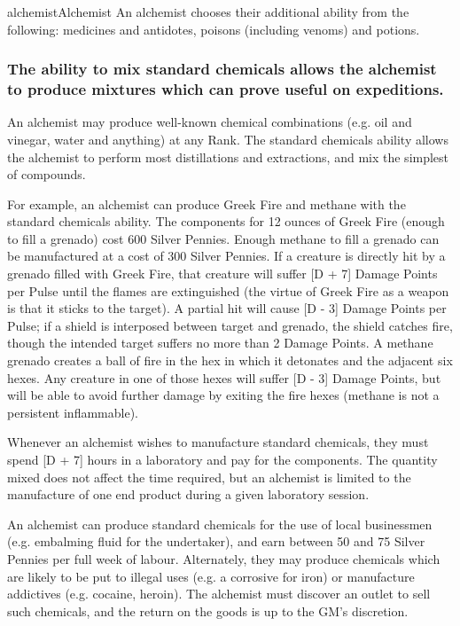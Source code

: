 \begin{Skill}[1.1]{alchemist}{Alchemist}
An alchemist chooses their additional ability from the following:
medicines and antidotes, poisons (including venoms) and potions.

\subsubsection{The ability to mix standard chemicals allows the alchemist to produce
mixtures which can prove useful on expeditions.}

An alchemist may produce well-known chemical combinations (e.g. oil
and vinegar, water and anything) at any Rank. The standard chemicals
ability allows the alchemist to perform most distillations and
extractions, and mix the simplest of compounds.

For example, an alchemist can produce Greek Fire and methane with the
standard chemicals ability.  The components for 12 ounces of Greek
Fire (enough to fill a grenado) cost 600 Silver Pennies.  Enough
methane to fill a grenado can be manufactured at a cost of 300 Silver
Pennies. If a creature is directly hit by a grenado filled with Greek
Fire, that creature will suffer [D + 7] Damage Points per Pulse until
the flames are extinguished (the virtue of Greek Fire as a weapon is
that it sticks to the target).  A partial hit will cause [D - 3]
Damage Points per Pulse; if a shield is interposed between target and
grenado, the shield catches fire, though the intended target suffers
no more than 2 Damage Points. A methane grenado creates a ball of fire
in the hex in which it detonates and the adjacent six hexes.  Any
creature in one of those hexes will suffer [D - 3] Damage Points, but
will be able to avoid further damage by exiting the fire hexes
(methane is not a persistent inflammable).

Whenever an alchemist wishes to manufacture standard chemicals, they
must spend [D + 7] hours in a laboratory and pay for the components.
The quantity mixed does not affect the time required, but an alchemist
is limited to the manufacture of one end product during a given
laboratory session.

An alchemist can produce standard chemicals for the use of local
businessmen (e.g. embalming fluid for the undertaker), and earn
between 50 and 75 Silver Pennies per full week of labour. Alternately,
they may produce chemicals which are likely to be put to illegal uses
(e.g.  a corrosive for iron) or manufacture addictives (e.g.  cocaine,
heroin).  The alchemist must discover an outlet to sell such
chemicals, and the return on the goods is up to the GM’s discretion.


\end{Skill}
